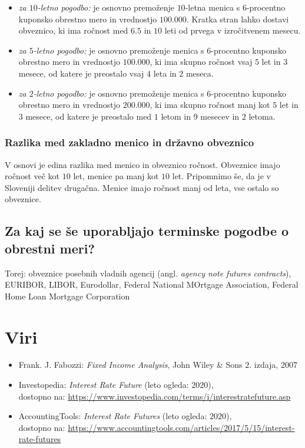 \documentclass[a4paper, 11pt]{article}
\begin{document}
\begin{itemize}
    \item \textit{za $10$-letno pogodbo:} je osnovno premoženje $10$-letna menica s $6$-procentno
            kuponsko obrestno mero in vrednostjo \textdollar$100.000$. Kratka stran lahko dostavi 
            obveznico, ki ima ročnost med $6.5$ in $10$ leti od prvega v izročitvenem mesecu.
    \item \textit{za $5$-letno pogodbo:} je osnovno premoženje menica s $6$-procentno kuponsko 
            obrestno mero in vrednostjo \textdollar$100.000$, ki ima skupno ročnost vsaj $5$ let
            in $3$ mesece, od katere je preostalo vsaj $4$ leta in $2$ meseca.
    \item \textit{za $2$-letno pogodbo:} je osnovno premoženje menica s $6$-procentno kuponsko 
    obrestno mero in vrednostjo \textdollar$200.000$, ki ima skupno ročnost manj kot $5$ let
    in $3$ mesece, od katere je preostalo med $1$ letom in $9$ mesecev in $2$ letoma.
\end{itemize} 

\subsubsection{Razlika med zakladno menico in državno obveznico}
V osnovi je edina razlika med menico in obveznico ročnost. Obveznice imajo ročnost več kot $10$
let, menice pa manj kot $10$ let. Pripomnimo še, da je v Sloveniji delitev drugačna. Menice imajo
ročnost manj od leta, vse ostalo so obveznice.

\subsection{Za kaj se še uporabljajo terminske pogodbe o obrestni meri?}
Torej: obveznice posebnih vladnih agencij (angl. \textit{agency note futures contracts}), EURIBOR, 
LIBOR, Eurodollar, Federal National MOrtgage Association, Federal Home Loan Mortgage Corporation

\pagebreak

\section{Viri}
\begin{itemize}
    \item Frank. J. Fabozzi: \textit{Fixed Income Analysis}, John Wiley \& Sons $2$. izdaja, 2007
    \item Investopedia: \textit{Interest Rate Future} (leto ogleda: $2020$), \\
            dostopno na: \url{https://www.investopedia.com/terms/i/interestratefuture.asp}
            \item AccountingTools: \textit{Interest Rate Futures} (leto ogleda: $2020$), \\
            dostopno na: \url{https://www.accountingtools.com/articles/2017/5/15/interest-rate-futures}
\end{itemize}
\end{document}
